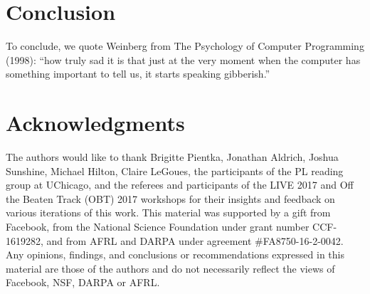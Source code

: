 \newcommand{\discussionSection}{Conclusion}
\section{\protect\discussionSection} %
\label{sec:discussion}
To conclude, we quote Weinberg from The Psychology of Computer Programming (1998): ``how truly sad it is that just at the very moment
when the computer has something important to tell us, it starts
speaking gibberish.''

\newcommand{\acksSection}{Acknowledgments}
\section*{\protect\acksSection} 
\label{sec:acks}

The authors would like to thank Brigitte Pientka, Jonathan Aldrich, Joshua Sunshine, Michael Hilton, Claire LeGoues,
the participants of the PL reading group at UChicago,
and the referees and participants of the LIVE 2017 and Off the Beaten Track (OBT)
2017 workshops for their insights and feedback on various iterations of this work.
%
This material was supported by a gift from
Facebook, from the National Science Foundation under grant
number CCF-1619282, and from AFRL and DARPA under agreement \#FA8750-16-2-0042. 
%
Any opinions, findings, and conclusions or recommendations expressed
in this material are those of the authors and do not necessarily
reflect the views of Facebook, NSF, DARPA or AFRL.
%










